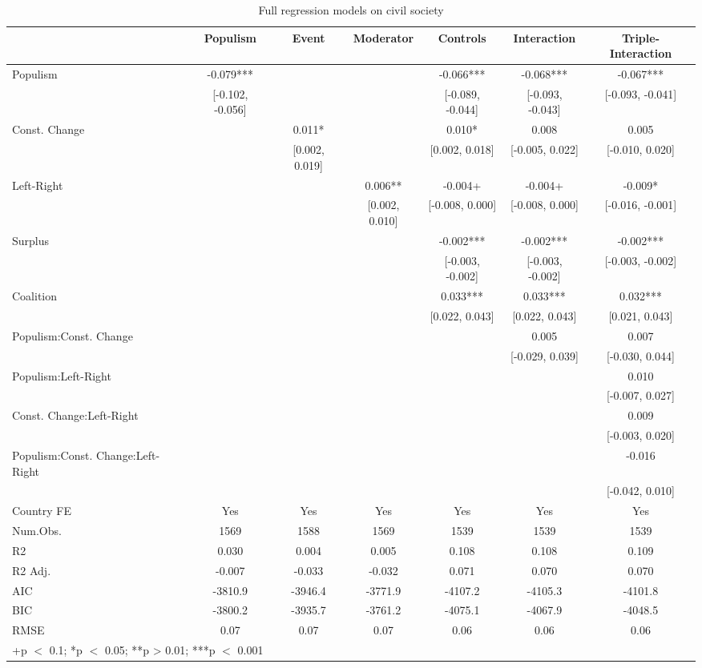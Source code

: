 \documentclass[
  abstract]{article}
\begin{document}
\renewcommand{\arraystretch}{0.5}
\setlength{\tabcolsep}{2pt}

\hypertarget{tbl-cspart}{}
\begin{table}
\caption{\label{tbl-cspart}Full regression models on civil society }\tabularnewline

\centering\centering\centering
\begin{tabular}[t]{lcccccc}
\toprule
  & Populism & Event & Moderator & Controls & Interaction & Triple-Interaction\\
\midrule
Populism & -0.079*** &  &  & -0.066*** & -0.068*** & -0.067***\\
 & {}[-0.102, -0.056] &  &  & {}[-0.089, -0.044] & {}[-0.093, -0.043] & {}[-0.093, -0.041]\\
Const. Change &  & 0.011* &  & 0.010* & 0.008 & 0.005\\
 &  & {}[0.002, 0.019] &  & {}[0.002, 0.018] & {}[-0.005, 0.022] & {}[-0.010, 0.020]\\
Left-Right &  &  & 0.006** & -0.004+ & -0.004+ & -0.009*\\
 &  &  & {}[0.002, 0.010] & {}[-0.008, 0.000] & {}[-0.008, 0.000] & {}[-0.016, -0.001]\\
Surplus &  &  &  & -0.002*** & -0.002*** & -0.002***\\
 &  &  &  & {}[-0.003, -0.002] & {}[-0.003, -0.002] & {}[-0.003, -0.002]\\
Coalition &  &  &  & 0.033*** & 0.033*** & 0.032***\\
 &  &  &  & {}[0.022, 0.043] & {}[0.022, 0.043] & {}[0.021, 0.043]\\
Populism:Const. Change &  &  &  &  & 0.005 & 0.007\\
 &  &  &  &  & {}[-0.029, 0.039] & {}[-0.030, 0.044]\\
Populism:Left-Right &  &  &  &  &  & 0.010\\
 &  &  &  &  &  & {}[-0.007, 0.027]\\
Const. Change:Left-Right &  &  &  &  &  & 0.009\\
 &  &  &  &  &  & {}[-0.003, 0.020]\\
Populism:Const. Change:Left-Right &  &  &  &  &  & -0.016\\
 &  &  &  &  &  & {}[-0.042, 0.010]\\
\midrule
Country FE & Yes & Yes & Yes & Yes & Yes & Yes\\
Num.Obs. & 1569 & 1588 & 1569 & 1539 & 1539 & 1539\\
R2 & 0.030 & 0.004 & 0.005 & 0.108 & 0.108 & 0.109\\
R2 Adj. & -0.007 & -0.033 & -0.032 & 0.071 & 0.070 & 0.070\\
AIC & -3810.9 & -3946.4 & -3771.9 & -4107.2 & -4105.3 & -4101.8\\
BIC & -3800.2 & -3935.7 & -3761.2 & -4075.1 & -4067.9 & -4048.5\\
RMSE & 0.07 & 0.07 & 0.07 & 0.06 & 0.06 & 0.06\\
\bottomrule
\multicolumn{7}{l}{\rule{0pt}{1em}+p $<$ 0.1; *p $<$ 0.05; **p > 0.01; ***p $<$ 0.001}\\
\end{tabular}
\end{table}
\end{document}
